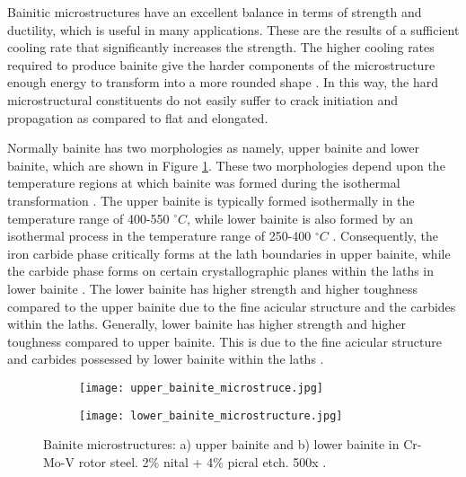 Bainitic microstructures have an excellent balance in terms of strength and ductility, which is useful in many applications. These are the results of a sufficient cooling rate that significantly increases the strength. The higher cooling rates required to produce bainite give the harder components of the microstructure enough energy to transform into a more rounded shape \cite{bajaj2020steels}. In this way, the hard microstructural constituents do not easily suffer to crack initiation and propagation as compared to flat and elongated.

Normally bainite has two morphologies as namely, upper bainite and lower bainite, which are shown in Figure \ref{ch3:figure:bainite:microstructures}. These two morphologies depend upon the temperature regions at which bainite was formed during the isothermal transformation \cite{molabe2018determining}. The upper bainite is typically formed isothermally in the temperature range of 400-550 $^\circ C$, while lower bainite is also formed by an isothermal process in the temperature range of 250-400 $^\circ C$ \cite{molabe2018determining}. Consequently, the iron carbide phase critically forms at the lath boundaries in upper bainite, while the carbide phase forms on certain crystallographic planes within the laths in lower bainite \cite{bajaj2020steels}. The lower bainite has higher strength and higher toughness compared to the upper bainite due to the fine acicular structure and the carbides within the laths. Generally, lower bainite has higher strength and higher toughness compared to upper bainite. This is due to the fine acicular structure and carbides possessed by lower bainite within the laths \cite{molabe2018determining}.
     
\begin{figure}[H]

\centering
\begin{subfigure}{.45\textwidth}
    \centering
    \texttt{[image: upper\_bainite\_microstruce.jpg]}
    \caption{}
\end{subfigure}
\begin{subfigure}{.45\textwidth}
    \centering
    \texttt{[image: lower\_bainite\_microstructure.jpg]}
    \caption{}
\end{subfigure}

\caption{Bainite microstructures: a) upper bainite and b) lower bainite in Cr-Mo-V rotor steel. 2\% nital + 4\% picral etch. 500x \cite{molabe2018determining}.}
\label{ch3:figure:bainite:microstructures}
\end{figure}

